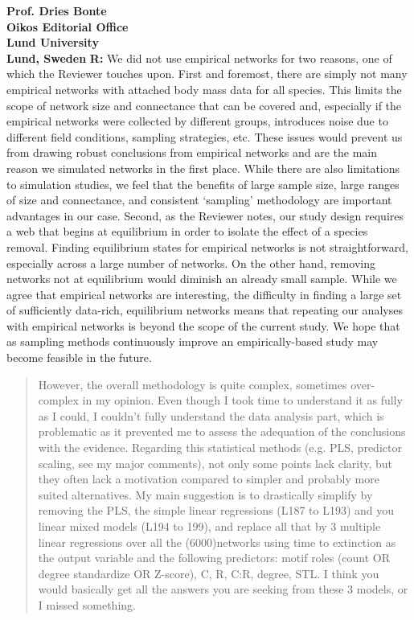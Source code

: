 \documentclass[12pt]{letter}
\begin{document}
\begin{letter}{\bf Prof. Dries Bonte\\
Oikos Editorial Office \\
Lund University \\
Lund, Sweden}
  \textbf{R:} We did not use empirical networks for two reasons, one of which the Reviewer touches upon. First and foremost, there are simply not many empirical networks with attached body mass data for all species. This limits the scope of network size and connectance that can be covered and, especially if the empirical networks were collected by different groups, introduces noise due to different field conditions, sampling strategies, etc. These issues would prevent us from drawing robust conclusions from empirical networks and are the main reason we simulated networks in the first place. While there are also limitations to simulation studies, we feel that the benefits of large sample size, large ranges of size and connectance, and consistent `sampling' methodology are important advantages in our case.
  Second, as the Reviewer notes, our study design requires a web that begins at equilibrium in order to isolate the effect of a species removal. Finding equilibrium states for empirical networks is not straightforward, especially across a large number of networks. On the other hand, removing networks not at equilibrium would diminish an already small sample. While we agree that empirical networks are interesting, the difficulty in finding a large set of sufficiently data-rich, equilibrium networks means that repeating our analyses with empirical networks is beyond the scope of the current study.
  We hope that as sampling methods continuously improve an empirically-based study may become feasible in the future.



  \begin{quotation}
  However, the overall methodology is quite complex, sometimes over-complex in my opinion. Even though I took time to understand it as fully as I could, I couldn’t fully understand the data analysis part, which is problematic as it prevented me to assess the adequation of the conclusions with the evidence. Regarding this statistical methods (e.g. PLS, predictor scaling, see my major comments), not only some points lack clarity, but they often lack a motivation compared to simpler and probably more suited alternatives. My main suggestion is to drastically simplify by removing the PLS, the simple linear regressions (L187 to L193) and you linear mixed models (L194 to 199), and replace all that by 3 multiple linear regressions over all the (6000)networks using time to extinction as the output variable and the following predictors: motif roles (count OR degree standardize OR Z-score), C, R, C:R, degree, STL. I think you would basically get all the answers you are seeking from these 3 models, or I missed something.
  \end{quotation}



\end{letter}
\end{document}
